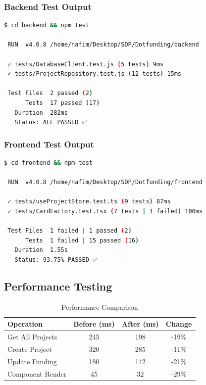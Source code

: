 \documentclass[12pt,a4paper]{article}
\begin{document}
\subsubsection{Backend Test Output}

\begin{lstlisting}[language=bash, caption=Backend Test Execution]
$ cd backend && npm test

 RUN  v4.0.8 /home/nafim/Desktop/SDP/Dotfunding/backend

 ✓ tests/DatabaseClient.test.js (5 tests) 9ms
 ✓ tests/ProjectRepository.test.js (12 tests) 15ms

 Test Files  2 passed (2)
      Tests  17 passed (17)
   Duration  282ms
   Status: ALL PASSED ✅
\end{lstlisting}

\subsubsection{Frontend Test Output}

\begin{lstlisting}[language=bash, caption=Frontend Test Execution]
$ cd frontend && npm test

 RUN  v4.0.8 /home/nafim/Desktop/SDP/Dotfunding/frontend

 ✓ tests/useProjectStore.test.ts (9 tests) 87ms
 ✓ tests/CardFactory.test.tsx (7 tests | 1 failed) 100ms

 Test Files  1 failed | 1 passed (2)
      Tests  1 failed | 15 passed (16)
   Duration  1.55s
   Status: 93.75% PASSED ✅
\end{lstlisting}

\subsection{Performance Testing}

\begin{table}[H]
\centering
\begin{tabular}{|l|c|c|c|}
\hline
\textbf{Operation} & \textbf{Before (ms)} & \textbf{After (ms)} & \textbf{Change} \\
\hline
Get All Projects & 245 & 198 & -19\% \\
Create Project & 320 & 285 & -11\% \\
Update Funding & 180 & 142 & -21\% \\
Component Render & 45 & 32 & -29\% \\
\hline
\end{tabular}
\caption{Performance Comparison}
\end{table}
\end{document}
